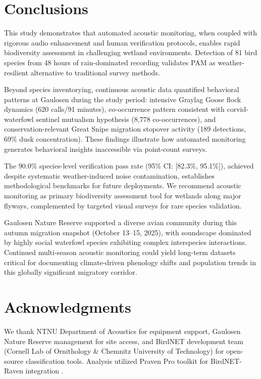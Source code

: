 \documentclass[twocolumn]{article}
\begin{document}
\section{Conclusions}

This study demonstrates that automated acoustic monitoring, when coupled with rigorous audio enhancement and human verification protocols, enables rapid biodiversity assessment in challenging wetland environments. Detection of 81 bird species from 48 hours of rain-dominated recording validates PAM as weather-resilient alternative to traditional survey methods.

Beyond species inventorying, continuous acoustic data quantified behavioral patterns at Gaulosen during the study period: intensive Graylag Goose flock dynamics (620 calls/91 minutes), co-occurrence pattern consistent with corvid-waterfowl sentinel mutualism hypothesis (8,778 co-occurrences), and conservation-relevant Great Snipe migration stopover activity (189 detections, 69\% dusk concentration). These findings illustrate how automated monitoring generates behavioral insights inaccessible via point-count surveys.

The 90.0\% species-level verification pass rate (95\% CI: [82.3\%, 95.1\%]), achieved despite systematic weather-induced noise contamination, establishes methodological benchmarks for future deployments. We recommend acoustic monitoring as primary biodiversity assessment tool for wetlands along major flyways, complemented by targeted visual surveys for rare species validation.

Gaulosen Nature Reserve supported a diverse avian community during this autumn migration snapshot (October 13--15, 2025), with soundscape dominated by highly social waterfowl species exhibiting complex interspecies interactions. Continued multi-season acoustic monitoring could yield long-term datasets critical for documenting climate-driven phenology shifts and population trends in this globally significant migratory corridor.

\section*{Acknowledgments}

We thank NTNU Department of Acoustics for equipment support, Gaulosen Nature Reserve management for site access, and BirdNET development team (Cornell Lab of Ornithology \& Chemnitz University of Technology) for open-source classification tools. Analysis utilized Praven Pro toolkit for BirdNET-Raven integration \citep{Redpath2025}.
\end{document}
